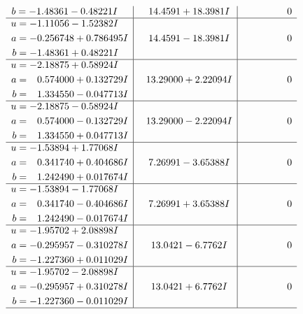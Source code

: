 \documentclass[1p]{elsarticle_modified}
\theoremstyle{definition}
\begin{document}
$$\begin{array}{c|c|c}
\begin{aligned}
b &= -1.48361 - 0.48221 I\end{aligned}
 & \phantom{-}14.4591 + 18.3981 I & \phantom{-0.000000 } 0 \\ \hline\begin{aligned}
u &= -1.11056 - 1.52382 I \\
a &= -0.256748 + 0.786495 I \\
b &= -1.48361 + 0.48221 I\end{aligned}
 & \phantom{-}14.4591 - 18.3981 I & \phantom{-0.000000 } 0 \\ \hline\begin{aligned}
u &= -2.18875 + 0.58924 I \\
a &= \phantom{-}0.574000 + 0.132729 I \\
b &= \phantom{-}1.334550 - 0.047713 I\end{aligned}
 & \phantom{-}13.29000 + 2.22094 I & \phantom{-0.000000 } 0 \\ \hline\begin{aligned}
u &= -2.18875 - 0.58924 I \\
a &= \phantom{-}0.574000 - 0.132729 I \\
b &= \phantom{-}1.334550 + 0.047713 I\end{aligned}
 & \phantom{-}13.29000 - 2.22094 I & \phantom{-0.000000 } 0 \\ \hline\begin{aligned}
u &= -1.53894 + 1.77068 I \\
a &= \phantom{-}0.341740 + 0.404686 I \\
b &= \phantom{-}1.242490 + 0.017674 I\end{aligned}
 & \phantom{-}7.26991 - 3.65388 I & \phantom{-0.000000 } 0 \\ \hline\begin{aligned}
u &= -1.53894 - 1.77068 I \\
a &= \phantom{-}0.341740 - 0.404686 I \\
b &= \phantom{-}1.242490 - 0.017674 I\end{aligned}
 & \phantom{-}7.26991 + 3.65388 I & \phantom{-0.000000 } 0 \\ \hline\begin{aligned}
u &= -1.95702 + 2.08898 I \\
a &= -0.295957 - 0.310278 I \\
b &= -1.227360 + 0.011029 I\end{aligned}
 & \phantom{-}13.0421 - 6.7762 I & \phantom{-0.000000 } 0 \\ \hline\begin{aligned}
u &= -1.95702 - 2.08898 I \\
a &= -0.295957 + 0.310278 I \\
b &= -1.227360 - 0.011029 I\end{aligned}
 & \phantom{-}13.0421 + 6.7762 I & \phantom{-0.000000 } 0\\
 \hline 
 \end{array}$$\newpage\newpage\renewcommand{\arraystretch}{1}
\end{document}
